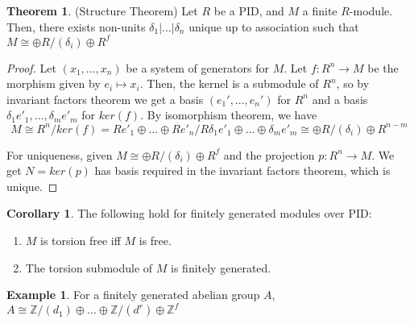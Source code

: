 \documentclass{article}
\theoremstyle{definition}
\newtheorem{theorem}{Theorem}[section]
\theoremstyle{definition}
\theoremstyle{definition}
\theoremstyle{definition}
\theoremstyle{definition}
\theoremstyle{definition}
\newtheorem{corollary}{Corollary}[theorem]
\theoremstyle{definition}
\newtheorem{example}{Example}[section]
\begin{document}
    \begin{tcolorbox}[colback=red!5!white,colframe=red!30!white]
    \begin{theorem}
    (Structure Theorem) Let $R$ be a PID, and $M$ a finite $R$-module. Then, there exists non-units $\delta_1|...|\delta_n$ unique up to association such that $M\cong \oplus R/(\delta_i)\oplus R^f$
    \end{theorem}
    \end{tcolorbox}
\begin{proof}
    Let $(x_1,...,x_n)$ be a system of generators for $M$. Let $f:R^n\to M$ be the morphism given by $e_i\mapsto x_i$. Then, the kernel is a submodule of $R^n$, so by invariant factors theorem we get a basis $(e_1',...,e_n')$ for $R^n$ and a basis  $\delta_1e'_1,...,\delta_me'_m$ for $ker(f)$. By isomorphism theorem, we have 
    \[M\cong R^n/ker(f)=Re'_1\oplus ...\oplus Re'_n/R\delta_1e'_1\oplus ...\oplus \delta_me'_m\cong \oplus R/(\delta_i)\oplus R^{n-m}\]
    
    
    For uniqueness, given $M\cong \oplus R/(\delta_i)\oplus R^f$ and the projection $p:R^n\to M$. We get $
    N=ker(p)$ has basis required in the invariant factors theorem, which is unique. 
\end{proof}


\begin{tcolorbox}[colback=green!5!white,colframe=green!30!white]
\begin{corollary}
The following hold for finitely generated modules over PID:
\begin{enumerate}
    \item $M$ is torsion free iff $M$ is free.
    \item The torsion submodule of $M$ is finitely generated.
\end{enumerate}
\end{corollary}
\end{tcolorbox}


\begin{tcolorbox}[colback=yellow!5!white,colframe=yellow!30!white]
\begin{example}
For a finitely generated abelian group $A$, $A\cong \mathbb{Z}/(d_1)\oplus...\oplus \mathbb{Z}/(d^r)\oplus \mathbb{Z}^f$
\end{example}
\end{tcolorbox}
\end{document}
